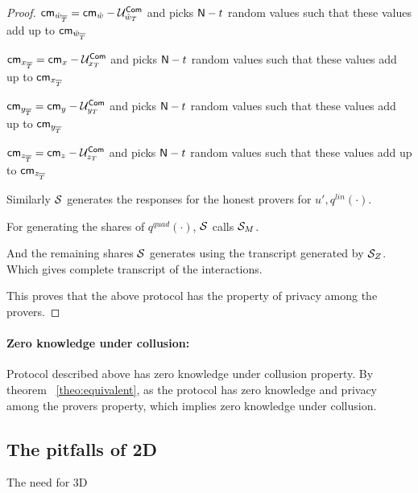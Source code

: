 \begin{proof}
	$\mathsf{cm}_{\hat{w}_{\overline{T}}} = \mathsf{cm}_{\hat{w}}-\mathcal{U}^{\mathsf{Com}}_{\hat{w}_{T}}$
	and picks $\mathsf{N} - t$ random values such that these values add up to $\mathsf{cm}_{\hat{w}_{\overline{T}}}$
	
	$\mathsf{cm}_{x_{\overline{T}}} = \mathsf{cm}_{x}-\mathcal{U}^{\mathsf{Com}}_{x_{T}}$
	and picks $\mathsf{N} - t$ random values such that these values add up to $\mathsf{cm}_{x_{\overline{T}}}$
	
	$\mathsf{cm}_{y_{\overline{T}}} = \mathsf{cm}_{y}-\mathcal{U}^{\mathsf{Com}}_{y_{T}}$
	and picks $\mathsf{N} - t$ random values such that these values add up to $\mathsf{cm}_{y_{\overline{T}}}$
	
	$\mathsf{cm}_{z_{\overline{T}}} = \mathsf{cm}_{z}-\mathcal{U}^{\mathsf{Com}}_{z_{T}}$
	and picks $\mathsf{N} - t$ random values such that these values add up to $\mathsf{cm}_{z_{\overline{T}}}$
	
	Similarly $\mathcal{S}$ generates the responses for the honest provers for $u', q^{lin}(\cdot)$. 
	
	For generating the shares of $q^{quad}(\cdot)$, $\mathcal{S}$ calls $\mathcal{S}_{M}$.
	
	And the remaining shares $\mathcal{S}$ generates using the transcript generated by $\mathcal{S}_{Z}$.
	Which gives complete transcript of the interactions.
	
	This proves that the above protocol has the property of privacy among the provers. 
\end{proof}

\paragraph{Zero knowledge under collusion: } Protocol described above has zero knowledge under collusion property. By theorem ~\ref{theo:equivalent}, as the protocol has zero knowledge and privacy among the provers property, which implies zero knowledge under collusion.
\subsection{The pitfalls of 2D}
The need for 3D